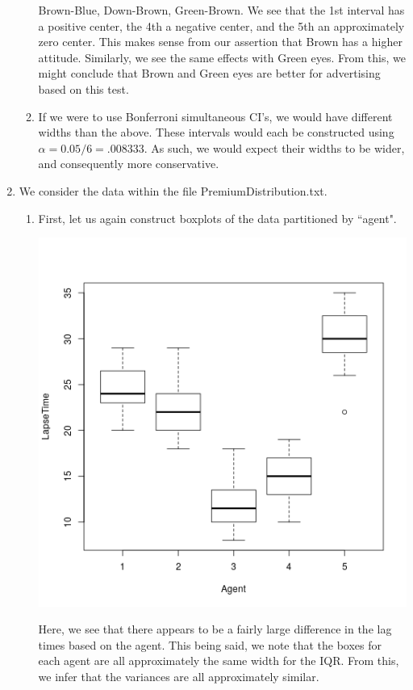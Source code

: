 \documentclass[letterpaper,10pt]{article}
\begin{document}
\begin{enumerate}
\begin{enumerate}
Brown-Blue, Down-Brown, Green-Brown. We see that the 1st interval has a positive center, the 4th a negative center, and the 5th an approximately zero center. This makes sense from our assertion that Brown has a higher attitude. Similarly, we see the same effects with Green eyes. From this, we might conclude that Brown and Green eyes are better for advertising based on this test.
\item If we were to use Bonferroni simultaneous CI's, we would have different widths than the above. These intervals would each be constructed using $\alpha=0.05/6=.008333$. As such, we would expect their widths to be wider, and consequently more conservative.
\end{enumerate}
\item We consider the data within the file PremiumDistribution.txt.
\begin{enumerate}
\item First, let us again construct boxplots of the data partitioned by ``agent".
\begin{center}
\includegraphics[scale=.65]{3box.png}
\end{center}
Here, we see that there appears to be a fairly large difference in the lag times based on the agent. This being said, we note that the boxes for each agent are all approximately the same width for the IQR. From this, we infer that the variances are all approximately similar.

\end{enumerate}
\end{enumerate}
\end{document}
